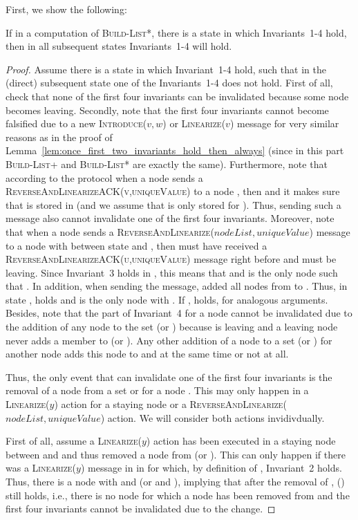 \documentclass[a4paper,USenglish]{lipics}
\newcommand{\blp}{\textsc{Build-List+}\xspace}
\newcommand{\blpp}{\textsc{Build-List*}\xspace}
\newcommand{\linearize}[1]{\textsc{Linearize(\ensuremath{#1})}\xspace}
\newcommand{\introduce}[1]{\textsc{Introduce(\ensuremath{#1})}\xspace}
\newcommand{\revandlin}[1]{\textsc{ReverseAndLinearize(\ensuremath{#1})}\xspace} \newcommand{\revandlinREQ}[1]{\textsc{ReverseAndLinearizeREQ(#1)}\xspace}
\newcommand{\revandlinACK}[1]{\textsc{ReverseAndLinearizeACK(#1)}\xspace}
\begin{document}
First, we show the following:
\begin{lemma}\label{lem:blpp_once_first_four_invariants_hold_then_always}
 If in a computation of \blpp, there is a state in which Invariants~1-4 hold, then in all subsequent states Invariants~1-4 will hold.
\end{lemma}
\begin{proof}
 Assume there is a state  in which Invariant~1-4 hold, such that in the (direct) subsequent state  one of the Invariants~1-4 does not hold.
 First of all, check that none of the first four invariants can be invalidated because some node becomes leaving.
 Secondly, note that the first four invariants cannot become falsified due to a new \introduce{v,w} or \linearize{v} message for very similar reasons as in the proof of Lemma~\ref{lem:once_first_two_invariants_hold_then_always} (since in this part \blp and \blpp are exactly the same).
 Furthermore, note that according to the protocol when a node  sends a \revandlinACK{v,uniqueValue} to a node , then  and it makes sure that  is stored in  (and we assume that  is only stored for ).
 Thus, sending such a message also cannot invalidate one of the first four invariants.
 Moreover, note that when a node  sends a \revandlin{nodeList,uniqueValue} message to a node  with  between state  and , then  must have received a \revandlinACK{u,uniqueValue} message right before and  must be leaving.
 Since Invariant~3 holds in , this means that  and  is the only node such that .
 In addition, when sending the message,  added all nodes from  to .
 Thus, in state ,  holds and  is the only node with .
 If ,  holds, for analogous arguments.
 Besides, note that the  part of Invariant~4 for a node  cannot be invalidated due to the addition of any node to the set  (or ) because  is leaving and a leaving node never adds a member to  (or ).
 Any other addition of a node to a set  (or ) for another node  adds this node to  and  at the same time or not at all.
 
 Thus, the only event that can invalidate one of the first four invariants is the removal of a node  from a set  or  for a node .
 This may only happen in a \linearize{y} action for a staying node or a \revandlin{nodeList, uniqueValue} action.
    We will consider both actions invidivdually.
    
    First of all, assume a \linearize{y} action has been executed in a staying node  between  and  and thus removed a node  from  (or ).
    This can only happen if there was a \linearize{y} message in  in  for which, by definition of , Invariant~2 holds.
    Thus, there is a node  with  and  (or  and ), implying that after the removal of ,  () still holds, i.e., there is no node  for which a node has been removed from  and the first four invariants cannot be invalidated due to the change.
 

\end{proof}
\end{document}
